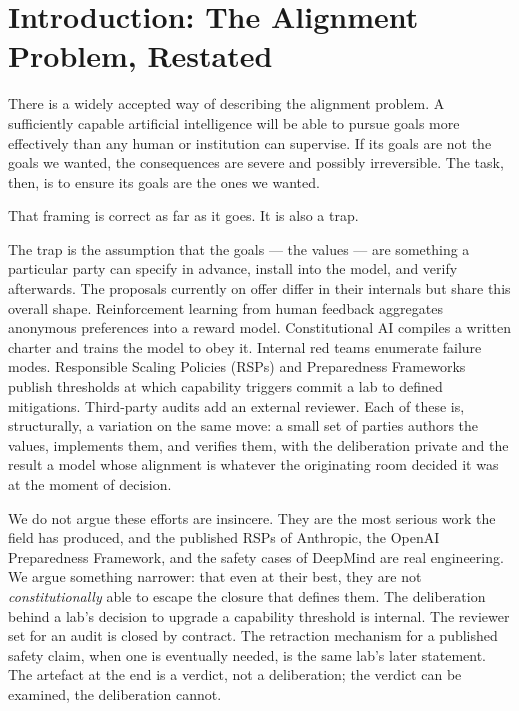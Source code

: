 \documentclass[11pt,a4paper]{article}
\begin{document}
\section{Introduction: The Alignment Problem, Restated}

There is a widely accepted way of describing the alignment problem.
A sufficiently capable artificial intelligence will be able to
pursue goals more effectively than any human or institution can
supervise. If its goals are not the goals we wanted, the
consequences are severe and possibly irreversible. The task, then,
is to ensure its goals are the ones we wanted.

That framing is correct as far as it goes. It is also a trap.

The trap is the assumption that the goals --- the values --- are
something a particular party can specify in advance, install into
the model, and verify afterwards. The proposals currently on
offer differ in their internals but share this overall shape.
Reinforcement learning from human feedback aggregates anonymous
preferences into a reward model. Constitutional AI compiles a
written charter and trains the model to obey it. Internal red
teams enumerate failure modes. Responsible Scaling Policies (RSPs)
and Preparedness Frameworks publish thresholds at which capability
triggers commit a lab to defined mitigations. Third-party audits
add an external reviewer. Each of these is, structurally, a
variation on the same move: a small set of parties authors the
values, implements them, and verifies them, with the deliberation
private and the result a model whose alignment is whatever the
originating room decided it was at the moment of decision.

We do not argue these efforts are insincere. They are the most
serious work the field has produced, and the published RSPs of
Anthropic, the OpenAI Preparedness Framework, and the safety
cases of DeepMind are real engineering. We argue something
narrower: that even at their best, they are not
\emph{constitutionally} able to escape the closure that defines
them. The deliberation behind a lab's decision to upgrade a
capability threshold is internal. The reviewer set for an audit
is closed by contract. The retraction mechanism for a published
safety claim, when one is eventually needed, is the same lab's
later statement. The artefact at the end is a verdict, not a
deliberation; the verdict can be examined, the deliberation
cannot.
\end{document}
